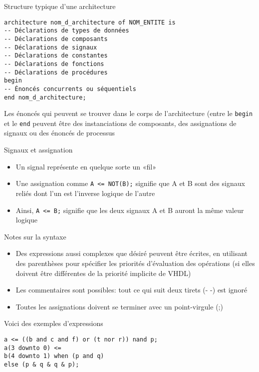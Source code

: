 \documentclass[presentation]{beamer}
\begin{document}
\begin{frame}[label={sec:orgf3367f3},fragile]{Structure typique d'une architecture}
 \begin{verbatim}
architecture nom_d_architecture of NOM_ENTITE is
-- Déclarations de types de données
-- Déclarations de composants
-- Déclarations de signaux
-- Déclarations de constantes
-- Déclarations de fonctions
-- Déclarations de procédures
begin
-- Énoncés concurrents ou séquentiels
end nom_d_architecture;
\end{verbatim}

Les énoncés qui peuvent se trouver dans le corps de l'architecture (entre le \texttt{begin} et le \texttt{end} peuvent être des instanciations de composants, des assignations de signaux ou des énoncés de processus
\end{frame}

\begin{frame}[label={sec:orgab7c9c6},fragile]{Signaux et assignation}
 \begin{itemize}
\item Un signal représente en quelque sorte un «fil»
\item Une assignation comme \texttt{A <= NOT(B);} signifie que A et B sont des signaux reliés dont l'un est l'inverse logique de l'autre
\item Ainsi, \texttt{A <= B;} signifie que les deux signaux A et B auront la même valeur logique
\end{itemize}
\end{frame}

\begin{frame}[label={sec:orga1f17a2},fragile]{Notes sur la syntaxe}
 \begin{itemize}
\item Des expressions aussi complexes que désiré peuvent être écrites, en utilisant des parenthèses pour spécifier les priorités d'évaluation des opérations (si elles doivent être différentes de la priorité implicite de VHDL)
\item Les commentaires sont possibles: tout ce qui suit deux tirets (- -) est ignoré
\item Toutes les assignations doivent se terminer avec un point-virgule (;)
\end{itemize}

Voici des exemples d'expressions
\begin{verbatim}
a <= ((b and c and f) or (t nor r)) nand p;
a(3 downto 0) <=
b(4 downto 1) when (p and q)
else (p & q & q & p);
\end{verbatim}
\end{frame}
\end{document}
